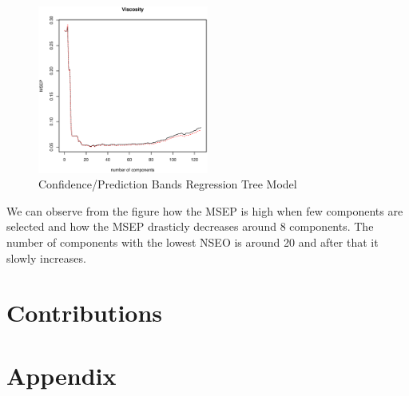 \documentclass[a4paper, twocolumn]{article}
\begin{document}
        \begin{figure}[h!]
            \centering
            \caption{Confidence/Prediction Bands Regression Tree Model}
            \label{fig:viscosity}
            \includegraphics[width=0.5\textwidth]{share/A2_viscosity.eps}
        \end{figure}

	We can observe from the figure how the MSEP is high when few components are selected and how the MSEP drasticly decreases around 8 components. The number of components with the lowest NSEO is around 20 and after that it slowly increases.
	
    \section*{Contributions}

    \nocite{*} %
    
    
    \onecolumn \appendix
    \section*{Appendix}

    
    
\end{document}
